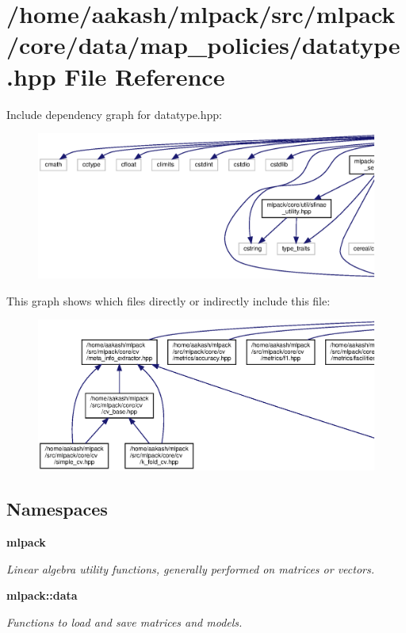 \section{/home/aakash/mlpack/src/mlpack/core/data/map\+\_\+policies/datatype.hpp File Reference}
\label{datatype_8hpp}
Include dependency graph for datatype.\+hpp\+:
\nopagebreak
\begin{figure}[H]
\begin{center}
\leavevmode
\includegraphics[width=350pt]{datatype_8hpp__incl}
\end{center}
\end{figure}
This graph shows which files directly or indirectly include this file\+:
\nopagebreak
\begin{figure}[H]
\begin{center}
\leavevmode
\includegraphics[width=350pt]{datatype_8hpp__dep__incl}
\end{center}
\end{figure}
\subsection*{Namespaces}
\begin{DoxyCompactItemize}
\item 
 \textbf{ mlpack}
\begin{DoxyCompactList}\small\item\em Linear algebra utility functions, generally performed on matrices or vectors. \end{DoxyCompactList}\item 
 \textbf{ mlpack\+::data}
\begin{DoxyCompactList}\small\item\em Functions to load and save matrices and models. \end{DoxyCompactList}\end{DoxyCompactItemize}
